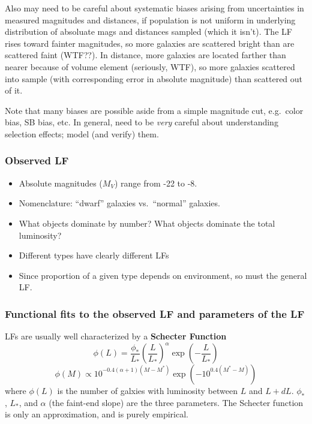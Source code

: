 \documentclass{article}
\newcommand{\mynotes}[1]{\textcolor{cadmiumorange}{#1}}
\begin{document}
Also may need to be careful about systematic biases arising from
uncertainties in measured magnitudes and distances, if population is
not uniform in underlying distribution of absoluate mags and distances
sampled (which it isn't). The LF rises toward fainter magnitudes, so
more galaxies are scattered bright than are scattered faint
\mynotes{(WTF??)}. In distance, more galaxies are located farther
than nearer because of volume element \mynotes{(seriously, WTF)}, so
more galaxies scattered into sample (with corresponding error in
absolute magnitude) than scattered out of it.

Note that many biases are possible aside from a simple magnitude cut, e.g.\
color bias, SB bias, etc. In general, need to be \emph{very} careful about
understanding selection effects; model (and verify) them.

\subsubsection{Observed LF}
\begin{itemize}
    \item Absolute magnitudes ($M_{V}$) range from -22 to -8.
    \item Nomenclature: ``dwarf'' galaxies vs.\ ``normal'' galaxies.
    \item What objects dominate by number? What objects dominate the
        total luminosity?
    \item Different types have clearly different LFs
    \item Since proportion of a given type depends on environment, so
        must the general LF.
\end{itemize}

\subsubsection{Functional fits to the observed LF and parameters of the LF}
LFs are usually well characterized by a \textbf{Schecter Function}
\[
    \phi(L) = \frac{\phi_{*}}{L_{*}}\left(\frac{L}{L_{*}}\right)^{\alpha}
    \exp\left(-\frac{L}{L_{*}}\right)
\]
\[
    \phi(M) \propto 10^{-0.4\left(\alpha+1\right)\left(M-M^*\right)}
    \exp\left(-10^{0.4(M^{*}-M)}\right)
\]
where $\phi(L)$ is the number of galxies with luminosity between
$L$ and $L + dL$.  $\phi_{*}$, $L_{*}$, and $\alpha$ (the faint-end slope)
are the three parameters. The Schecter function is only an approximation, and
is purely empirical.
\end{document}
